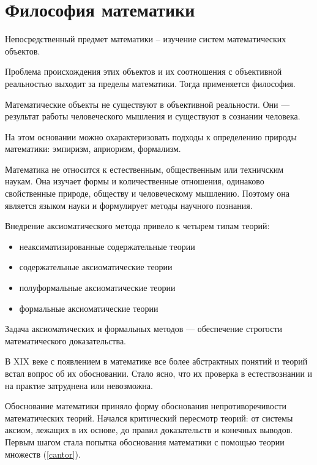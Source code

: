 \documentclass[a4paper,14pt]{extreport}
\begin{document}

\thispagestyle{empty}
\setcounter{page}{0}
\tableofcontents
\clearpage

\chapter{Философия математики}

Непосредственный предмет математики -- изучение систем математических объектов.

Проблема происхождения этих объектов и их соотношения с объективной реальностью выходит за пределы математики. Тогда применяется философия.

Математические объекты не существуют в объективной реальности. Они --- результат работы человеческого мышления и существуют в сознании человека. 

На этом основании можно охарактеризовать подходы к определению природы математики: эмпиризм, априоризм, формализм.
\cite{mironov}

Математика не относится к естественным, общественным или техничским наукам. Она изучает формы и количественные отношения, одинаково свойственные природе, обществу и человеческому мышлению. Поэтому она является языком науки и формулирует методы научного познания.
\cite{mironov}

Внедрение аксиоматического
метода привело к четырем типам теорий:
\begin{itemize}
\item неаксиматизированные содержательные теории
\item содержательные аксиоматические теории
\item полуформальные аксиоматические теории
\item формальные аксиоматические теории
\end{itemize}

Задача аксиоматических и формальных методов --- обеспечение строгости математического доказательства.

В XIX веке с появлением в математике все более абстрактных понятий и теорий встал вопрос об их обосновании. Стало ясно, что их проверка в естествознании и на практие затруднена или невозможна. 

Обоснование математики приняло форму обоснования непротиворечивости математических теорий. Начался критический пересмотр теорий: от системы аксиом, лежащих в их основе, до правил доказательств и конечных выводов. Первым шагом стала попытка обоснования математики с помощью теории множеств (\ref{cantor}).
\end{document}
